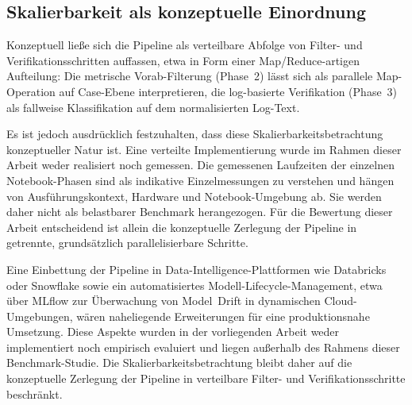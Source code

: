 \subsection{Skalierbarkeit als konzeptuelle Einordnung}
\label{sec:scalability}

Konzeptuell ließe sich die Pipeline als verteilbare Abfolge von Filter- und Verifikationsschritten auffassen, etwa in Form einer Map/Reduce-artigen Aufteilung: Die metrische Vorab-Filterung (Phase~2) lässt sich als parallele Map-Operation auf Case-Ebene interpretieren, die log-basierte Verifikation (Phase~3) als fallweise Klassifikation auf dem normalisierten Log-Text.

Es ist jedoch ausdrücklich festzuhalten, dass diese Skalierbarkeitsbetrachtung konzeptueller Natur ist. Eine verteilte Implementierung wurde im Rahmen dieser Arbeit weder realisiert noch gemessen. Die gemessenen Laufzeiten der einzelnen Notebook-Phasen sind als indikative Einzelmessungen zu verstehen und hängen von Ausführungskontext, Hardware und Notebook-Umgebung ab. Sie werden daher nicht als belastbarer Benchmark herangezogen. Für die Bewertung dieser Arbeit entscheidend ist allein die konzeptuelle Zerlegung der Pipeline in getrennte, grundsätzlich parallelisierbare Schritte.

Eine Einbettung der Pipeline in Data-Intelligence-Plattformen wie Databricks oder Snowflake sowie ein automatisiertes Modell-Lifecycle-Management, etwa über MLflow zur Überwachung von Model~Drift in dynami\-schen Cloud-Um\-gebungen, wären naheliegende Erweiterungen für eine produktionsnahe Umsetzung. Diese Aspekte wurden in der vorliegenden Arbeit weder implementiert noch empirisch evaluiert und liegen außerhalb des Rahmens dieser Benchmark-Studie. Die Skalierbarkeitsbetrachtung bleibt daher auf die konzeptuelle Zerlegung der Pipeline in verteilbare Filter- und Verifikationsschritte beschränkt.
